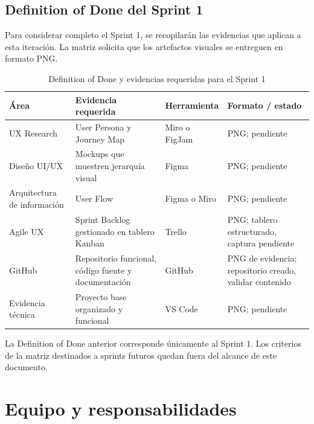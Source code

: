 \documentclass[12pt,a4paper]{article}
\begin{document}
\subsection{Definition of Done del Sprint 1}

Para considerar completo el Sprint 1, se recopilarán las evidencias que aplican a
esta iteración. La matriz solicita que los artefactos visuales se entreguen en formato
PNG.

\begin{table}[htbp]
    \centering
    \caption{Definition of Done y evidencias requeridas para el Sprint 1}
    \label{tab:definition-of-done}
    \begin{tabularx}{\textwidth}{L{2.7cm}Y L{2.7cm} L{2.0cm}}
        \toprule
        \textbf{Área} & \textbf{Evidencia requerida} & \textbf{Herramienta} & \textbf{Formato / estado} \\
        \midrule
        UX Research & User Persona y Journey Map & Miro o FigJam & PNG; pendiente \\
        Diseño UI/UX & Mockups que muestren jerarquía visual & Figma & PNG; pendiente \\
        Arquitectura de información & User Flow & Figma o Miro & PNG; pendiente \\
        Agile UX & Sprint Backlog gestionado en tablero Kanban & Trello & PNG; tablero estructurado, captura pendiente \\
        GitHub & Repositorio funcional, código fuente y documentación & GitHub & PNG de evidencia; repositorio creado, validar contenido \\
        Evidencia técnica & Proyecto base organizado y funcional & VS Code & PNG; pendiente \\
        \bottomrule
    \end{tabularx}
\end{table}

La Definition of Done anterior corresponde únicamente al Sprint 1. Los criterios de
la matriz destinados a sprints futuros quedan fuera del alcance de este documento.

\section{Equipo y responsabilidades}
\end{document}
